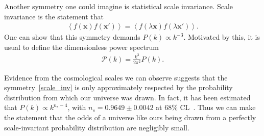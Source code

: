     Another symmetry one could imagine is statistical scale invariance.
    Scale invariance is the statement that
    \begin{align}\label{scale_inv}
        \left<f(\mathbf{x})f(\mathbf{x'})\right> = \left<f(\lambda\mathbf{x})f(\lambda\mathbf{x'})\right>.
    \end{align}
    One can show that this symmetry demands $P(k)\propto k^{-3}$.
    Motivated by this, it is usual to define the dimensionless power spectrum
    \begin{align}\label{primpowerspec_defn}
        \mathcal{P}(k) = \frac{k^3}{2\pi^2}P(k).
    \end{align}


    Evidence from the cosmological scales we can observe
    suggests that the symmetry~\eqref{scale_inv} is 
    only approximately respected by the probability
    distribution from which our universe was drawn.
    In fact, it has been estimated that $P(k)\propto k^{n_s-4}$, with $n_s=0.9649 \pm 0.0042$
    at $68\%$ CL~\cite{Planck_inflation_2015, Planck_inflation_2018}.
    Thus we can make the statement that
    the odds of a universe like ours being drawn from a
    perfectly scale-invariant probability
    distribution are negligibly small.





